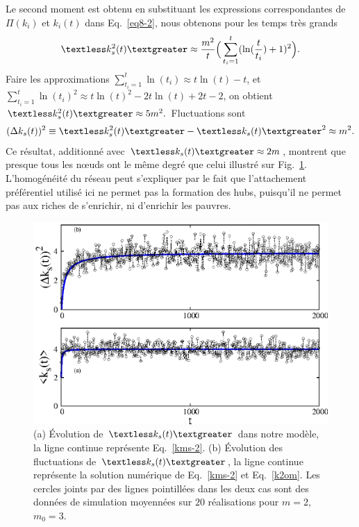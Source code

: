 Le second moment est obtenu en substituant les expressions correspondantes de $\Pi(k_i)$ et $k_i(t)$ dans Eq.~\eqref {eq8-2}, nous obtenons pour les temps très grands
 \begin{eqnarray}
\begin{split}
\kmss\approx \frac{m^2}{t}\Big(\sum_{t_i=1}^t (\ln(\frac{t}{t_i})+1)^2\Big).
\label{k2om}
\end{split}
\end{eqnarray}
Faire les approximations  $\sum_{t_i=1}^t \ln(t_i)\approx t\ln(t)-t$, et
$\sum_{t_i=1}^t \ln(t_i)^2\approx t\ln(t)^2-2t\ln(t)+2t-2$, on obtient $\kmss\approx 5m^2.$ Fluctuations sont 
\begin{eqnarray}
 (\Delta k_s(t))^2 \equiv {\kmss-\kms^2}\approx m^2.
\end{eqnarray}
 Ce résultat, additionné avec $\kms\approx 2m $, montrent que presque tous les nœuds ont le même degré que celui illustré sur Fig.~\ref{fig2b-2}. L'homogénéité du réseau peut s'expliquer par le fait que l'attachement préférentiel utilisé ici ne permet pas la formation des hubs, puisqu'il ne permet pas aux riches de s'enrichir, ni d'enrichir les pauvres. 
\begin{figure}[h]
	\centering
	\includegraphics[scale=1]{./figures/nfig3}
	\caption{(a) Évolution de $\kms$ dans notre modèle, la ligne continue représente Eq.~\eqref{kms-2}.
	(b) Évolution des fluctuations de $\kms$, la ligne continue représente la solution numérique de Eq.~\eqref{kms-2} et Eq.~\eqref{k2om}. Les cercles joints par des lignes pointillées dans les deux cas sont des données de simulation moyennées sur $20$ réalisations pour $m=2$, $m_0=3$.}
	\label{fig2b-2}
\end{figure}
 \vspace{4cm}
